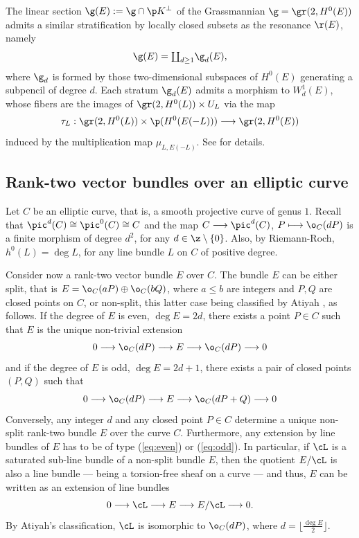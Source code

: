 \documentclass[10pt, leqno]{amsart}
\begin{document}
\begin{rem} \label{rem_g(E)}
The linear section $\g(E): = \g \cap \p K^\perp$ of the Grassmannian $\g = \gr(2, H^0(E))$ admits a similar stratification by locally closed subsets as the resonance $\r(E)$, namely
\[
\g(E) = \textstyle{\coprod_{d \ge 1}} \g_d(E),
\]
where $\g_d$ is formed by those two-dimensional subspaces of $H^0(E)$ generating a subpencil of degree $d$. Each stratum $\g_d(E)$ admits a morphism to $W^1_d(E)$, whose fibers are the images of $\gr(2, H^0(L)) \times U_L$ via the map
\[
\tau_L:\gr(2, H^0(L)) \times \p(H^0(E(-L))) \longrightarrow \gr(2, H^0(E))
\]
induced by the multiplication map $\mu_{L,E(-L)}$. See \cite[\S 3-4]{aprodu_linear_2025} for details.
\end{rem}



\subsection{Rank-two vector bundles over an elliptic curve}

Let $C$ be an elliptic curve, that is, a smooth projective curve of genus $1$. 
Recall that $\pic^d(C) \cong  \pic^0(C) \cong C$ and the map $C \longrightarrow \pic^d(C)$, $P \longmapsto \o_C(dP)$ is a finite morphism of degree $d^2$, for any $d \in \z \setminus \{0\}$. 
Also, by Riemann-Roch, $h^0(L) = \deg L$, for any line bundle $L$ on $C$ of positive degree. 

Consider now a rank-two vector bundle $E$ over $C$. 
The bundle $E$ can be either split, that is $E = \o_C(aP) \oplus \o_C(bQ)$, where $a \le b$ are integers and $P, Q$ are closed points on $C$, or non-split, this latter case being classified by Atiyah \cite{atiyah_1957}, \cite[\S 5]{hartshorne_1977} as follows. 
If the degree of $E$ is even, $\deg E = 2d$, there exists a point $P \in C$ such that $E$ is the unique non-trivial extension
\begin{equation} \label{eq:even}
0 \longrightarrow \o_C(dP) \longrightarrow E \longrightarrow \o_C(dP) \longrightarrow 0
\end{equation}
and if the degree of $E$ is odd, $\deg E = 2d + 1$, there exists a pair of closed points $(P,Q)$ such that
\begin{equation} \label{eq:odd}
0 \longrightarrow \o_C(dP) \longrightarrow E \longrightarrow \o_C(dP + Q) \longrightarrow 0   
\end{equation}
Conversely, any integer $d$ and any closed point $P \in C$ determine a unique non-split rank-two bundle $E$ over the curve $C$. 
Furthermore, any extension by line bundles of $E$ has to be of type (\ref{eq:even}) or (\ref{eq:odd}).
In particular, if $\cL$ is a saturated sub-line bundle of a non-split bundle $E$, then the quotient $E/\cL$ is also a line bundle --- being a torsion-free sheaf on a curve --- and thus, $E$ can be written as an extension of line bundles
\[
0 \longrightarrow \cL \longrightarrow E \longrightarrow E/\cL \longrightarrow 0 .
\]
By Atiyah's classification, $\cL$ is isomorphic to $\o_C(dP)$, where $d = \lfloor \frac{\deg E}{2} \rfloor$.
\end{document}
